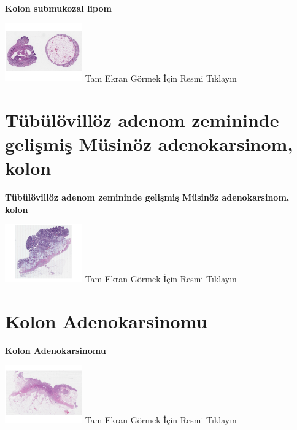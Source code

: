 \documentclass[
  letterpaper,
  DIV=11,
  numbers=noendperiod]{scrreprt}
\begin{document}
\textbf{Kolon submukozal lipom}

\href{https://images.patolojiatlasi.com/colon-submucosal-lipoma/HE.html}{\includegraphics[width=0.25\textwidth,height=\textheight]{./screenshots/thumbnail_colon-submucosal-lipoma.png}}
\href{https://images.patolojiatlasi.com/colon-submucosal-lipoma/HE.html}{Tam
Ekran Görmek İçin Resmi Tıklayın}

\hypertarget{sec-tubulovilloz-adenom-zemininde-adenokarsinom}{%
\chapter{Tübülövillöz adenom zemininde gelişmiş Müsinöz adenokarsinom,
kolon}\label{sec-tubulovilloz-adenom-zemininde-adenokarsinom}}

\textbf{Tübülövillöz adenom zemininde gelişmiş Müsinöz adenokarsinom,
kolon}

\href{https://images.patolojiatlasi.com/mucinous-adenocarcinoma-colon/HE.html}{\includegraphics[width=0.25\textwidth,height=\textheight]{./screenshots/thumbnail_mucinous-adenocarcinoma-colon.png}}
\href{https://images.patolojiatlasi.com/mucinous-adenocarcinoma-colon/HE.html}{Tam
Ekran Görmek İçin Resmi Tıklayın}

\hypertarget{sec-kolon-adenokarsinomu}{%
\chapter{Kolon Adenokarsinomu}\label{sec-kolon-adenokarsinomu}}

\textbf{Kolon Adenokarsinomu}

\href{https://images.patolojiatlasi.com/colon-adenocarcinoma/HE.html}{\includegraphics[width=0.25\textwidth,height=\textheight]{./screenshots/thumbnail_colon-adenocarcinoma-1.png}}
\href{https://images.patolojiatlasi.com/colon-adenocarcinoma/HE.html}{Tam
Ekran Görmek İçin Resmi Tıklayın}
\end{document}
